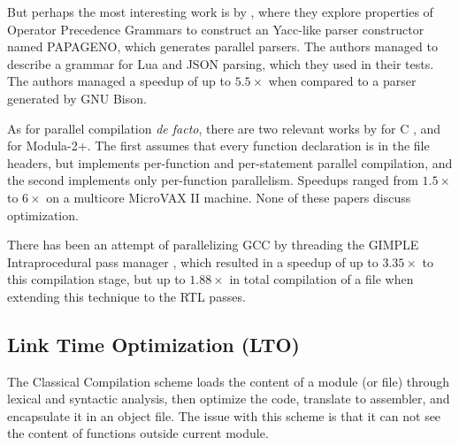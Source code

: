 \documentclass[runningheads]{llncs}
\begin{document}
But perhaps the most interesting work is by
\cite{Barenghi:2015:PPM:2839536.2840146}, where they explore properties of
Operator Precedence Grammars to construct an Yacc-like parser constructor named
PAPAGENO, which generates parallel parsers. The authors managed to describe a
grammar for Lua and JSON parsing, which they used in their tests. The authors
managed a speedup of up to $5.5\times$ when compared to a parser generated by
GNU Bison.

As for parallel compilation \textit{de facto}, there are two relevant works by
\cite{vandevoorde1988parallel} for C , and \cite{wortman1992} for Modula-2+.
The first assumes that every function declaration is in the file headers, but
implements per-function and per-statement parallel compilation, and the second
implements only per-function parallelism.  Speedups ranged from $1.5\times$ to
$6\times$ on a multicore MicroVAX II machine. None of these papers discuss
optimization.

There has been an attempt of parallelizing GCC by threading the GIMPLE
Intraprocedural pass manager \cite{bernardino2020improving}, which resulted in
a speedup of up to $3.35\times$ to this compilation stage, but up to $1.88\times$ in
total compilation of a file when extending this technique to the RTL passes.


\subsection{Link Time Optimization (LTO)} \label{lto_section}

The Classical Compilation scheme loads the content of a module (or file) through
lexical and syntactic analysis, then optimize the code, translate to assembler, and
encapsulate it in an object file. The issue with this scheme is that it can not
see the content of functions outside current module.
\end{document}
